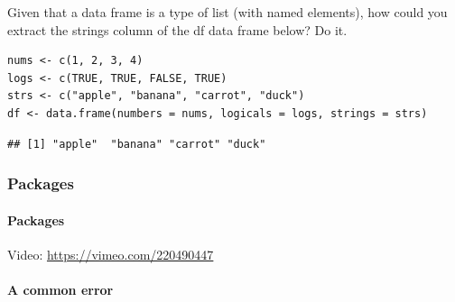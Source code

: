 \documentclass[
]{article}
\newenvironment{Shaded}{\begin{snugshade}}{\end{snugshade}}
\newcommand{\AttributeTok}[1]{\textcolor[rgb]{0.77,0.63,0.00}{#1}}
\newcommand{\ConstantTok}[1]{\textcolor[rgb]{0.00,0.00,0.00}{#1}}
\newcommand{\DecValTok}[1]{\textcolor[rgb]{0.00,0.00,0.81}{#1}}
\newcommand{\FunctionTok}[1]{\textcolor[rgb]{0.00,0.00,0.00}{#1}}
\newcommand{\NormalTok}[1]{#1}
\newcommand{\OtherTok}[1]{\textcolor[rgb]{0.56,0.35,0.01}{#1}}
\newcommand{\SpecialCharTok}[1]{\textcolor[rgb]{0.00,0.00,0.00}{#1}}
\newcommand{\StringTok}[1]{\textcolor[rgb]{0.31,0.60,0.02}{#1}}
\begin{document}
Given that a data frame is a type of list (with named elements), how
could you extract the strings column of the df data frame below? Do it.

\begin{verbatim}
nums <- c(1, 2, 3, 4)
logs <- c(TRUE, TRUE, FALSE, TRUE)
strs <- c("apple", "banana", "carrot", "duck")
df <- data.frame(numbers = nums, logicals = logs, strings = strs)
\end{verbatim}

\begin{Shaded}
\end{Shaded}

\begin{verbatim}
## [1] "apple"  "banana" "carrot" "duck"
\end{verbatim}

\hypertarget{packages}{%
\subsubsection{Packages}\label{packages}}

\hypertarget{packages-1}{%
\paragraph{Packages}\label{packages-1}}

Video: \url{https://vimeo.com/220490447}

\hypertarget{a-common-error}{%
\paragraph{A common error}\label{a-common-error}}
\end{document}
